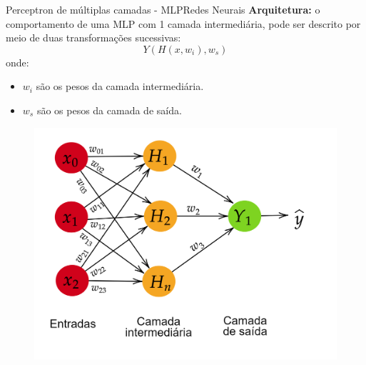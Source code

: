 \documentclass[t]{beamer}
\begin{document}

\begin{ftst}{Perceptron de múltiplas camadas - MLP}{Redes Neurais}
\textbf{Arquitetura:}
o comportamento de uma MLP com 1 camada intermediária, pode ser descrito por meio de duas transformações sucessivas:
    \begin{equation}
        Y(H(x,w_i),w_s)
    \end{equation}
    \scriptsize
onde:
    \begin{itemize}
        \item $w_i$ são os pesos da camada intermediária.
        \item $w_s$ são os pesos da camada de saída.
    \end{itemize}
    
\begin{figure}
    \centering
    \includegraphics[scale=0.13]{Figuras/mlp.png}
\end{figure}

\end{ftst}

\end{document}
